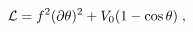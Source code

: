 \begin{equation}
\label{eq:PNGBlag}
{\cal{L}} = f^2 (\partial \theta)^2 + V_0 (1 - \cos\theta) \;, 
\end{equation} 
